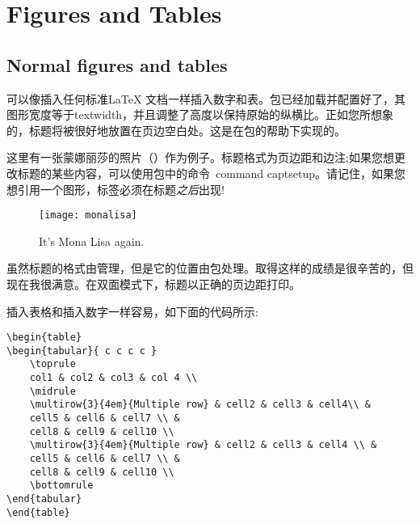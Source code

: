 \setchapterpreamble[u]{\margintoc}
\chapter[Figures and Tables]{Figures and Tables\footnotemark[0]}


\section{Normal figures and tables}

可以像插入任何标准\LaTeX\xspace 文档一样插入数字和表。包已经加载并配置好了，其图形宽度等于textwidth，并且调整了高度以保持原始的纵横比。正如您所想象的，标题将被很好地放置在页边空白处。这是在包的帮助下实现的。

这里有一张蒙娜丽莎的照片（）作为例子。标题格式为页边距和边注;如果您想更改标题的某些内容，可以使用包中的命令\ command {captsetup}。请记住，如果您想引用一个图形，标签必须在标题\emph{之后}出现!

\begin{figure}[hb]
	\texttt{[image: monalisa]}
	\caption[Mona Lisa, again]{It's Mona Lisa again. \blindtext}
\end{figure}

虽然标题的格式由管理，但是它的位置由包处理。取得这样的成绩是很辛苦的，但现在我很满意。在双面模式下，标题以正确的页边距打印。

插入表格和插入数字一样容易，如下面的代码所示:

\begin{lstlisting}
\begin{table}
\begin{tabular}{ c c c c }
	\toprule
	col1 & col2 & col3 & col 4 \\
	\midrule
	\multirow{3}{4em}{Multiple row} & cell2 & cell3 & cell4\\ &
	cell5 & cell6 & cell7 \\ &
	cell8 & cell9 & cell10 \\
	\multirow{3}{4em}{Multiple row} & cell2 & cell3 & cell4 \\ &
	cell5 & cell6 & cell7 \\ &
	cell8 & cell9 & cell10 \\
	\bottomrule
\end{tabular}
\end{table}
\end{lstlisting}


